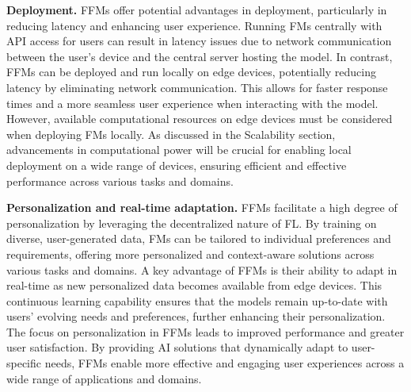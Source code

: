 \textbf{Deployment.}
FFMs offer potential advantages in deployment, particularly in reducing latency and enhancing user experience. Running FMs centrally with API access for users can result in latency issues due to network communication between the user's device and the central server hosting the model. In contrast, FFMs can be deployed and run locally on edge devices, potentially reducing latency by eliminating network communication. This allows for faster response times and a more seamless user experience when interacting with the model. However, available computational resources on edge devices must be considered when deploying FMs locally. As discussed in the Scalability section, advancements in computational power will be crucial for enabling local deployment on a wide range of devices, ensuring efficient and effective performance across various tasks and domains.


\textbf{Personalization and real-time adaptation.}
FFMs facilitate a high degree of personalization by leveraging the decentralized nature of FL. By training on diverse, user-generated data, FMs can be tailored to individual preferences and requirements, offering more personalized and context-aware solutions across various tasks and domains.
A key advantage of FFMs is their ability to adapt in real-time as new personalized data becomes available from edge devices. This continuous learning capability ensures that the models remain up-to-date with users' evolving needs and preferences, further enhancing their personalization.
The focus on personalization in FFMs leads to improved performance and greater user satisfaction. By providing AI solutions that dynamically adapt to user-specific needs, FFMs enable more effective and engaging user experiences across a wide range of applications and domains.


